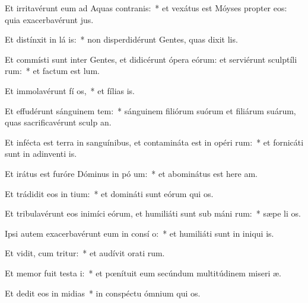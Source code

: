 \item Et irritavérunt eum ad Aquas contranis:~* et vexátus est Móyses propter eos: quia exacerbavérunt  jus.
\item Et distínxit in lá is:~* non disperdidérunt Gentes, quas dixit  lis.
\item Et commísti sunt inter Gentes, et didicérunt ópera eórum: et serviérunt sculptíli rum:~* et factum est   lum.
\item Et immolavérunt fí os,~* et fílias  is.
\item Et effudérunt sánguinem tem:~* sánguinem filiórum suórum et filiárum suárum, quas sacrificavérunt sculp an.
\item Et infécta est terra in sanguínibus, et contamináta est in opéri rum:~* et fornicáti sunt in adinventi is.
\item Et irátus est furóre Dóminus in pó um:~* et abominátus est here am.
\item Et trádidit eos in  tium:~* et domináti sunt eórum qui  os.
\item Et tribulavérunt eos inimíci eórum, et humiliáti sunt sub máni rum:~* sæpe li os.
\item Ipsi autem exacerbavérunt eum in consí o:~* et humiliáti sunt in iniqui is.
\item Et vidit, cum tritur:~* et audívit orati rum.
\item Et memor fuit testa i:~* et pœnítuit eum secúndum multitúdinem miseri æ.
\item Et dedit eos in midias~* in conspéctu ómnium qui  os.
